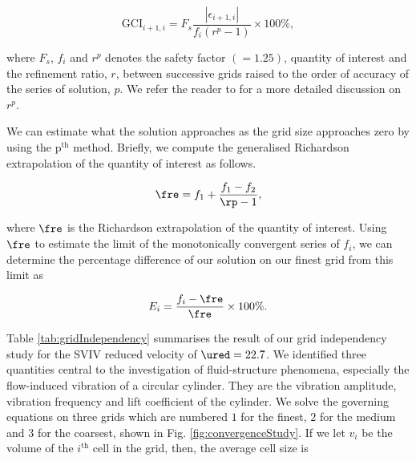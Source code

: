 \documentclass[a4paper,fleqn]{cas-sc}
\begin{document}
\begin{equation}
  \text{GCI}_{i+1,i} = F_{s} \frac{\left |\epsilon_{i+1,i} \right |}{f_{i} \left ( r^{p} - 1 \right )} \times 100\%,
  \label{eq:gci}
\end{equation}

\noindent where $F_{s}$, $f_{i}$ and $r^{p}$ denotes the safety factor $\left ( = 1.25 \right )$, quantity of interest and the refinement ratio, $r$, between successive grids raised to the order of accuracy of the series of solution, $p$. We refer the reader to \citet{Stern2001,Langley2018} for a more detailed discussion on $r^{p}$.

We can estimate what the solution approaches as the grid size approaches zero by using the $\text{p}^{\text{th}}$ method. Briefly, we compute the generalised Richardson extrapolation of the quantity of interest as follows.

\begin{equation}
  \fre = f_{1} + \frac{f_{1} - f_{2}}{\rp - 1},
  \label{eq:richardsonExtrapolation}
\end{equation}

\noindent where $\fre$ is the Richardson extrapolation of the quantity of interest. Using $\fre$ to estimate the limit of the monotonically convergent series of $f_{i}$, we can determine the percentage difference of our solution on our finest grid from this limit as

\begin{equation}
  E_{i} = \frac{f_{i} - \fre}{\fre} \times 100\%.
  \label{eq:percentageDifference}
\end{equation}

Table \ref{tab:gridIndependency} summarises the result of our grid independency study for the SVIV reduced velocity of $\ured = 22.7$. We identified three quantities central to the investigation of fluid-structure phenomena, especially the flow-induced vibration of a circular cylinder. They are the vibration amplitude, vibration frequency and lift coefficient of the cylinder. We solve the governing equations on three grids which are numbered $1$ for the finest, $2$ for the medium and $3$ for the coarsest, shown in Fig. \ref{fig:convergenceStudy}. If we let $v_{i}$ be the volume of the $i^{\text{th}}$ cell in the grid, then, the average cell size is
\end{document}
